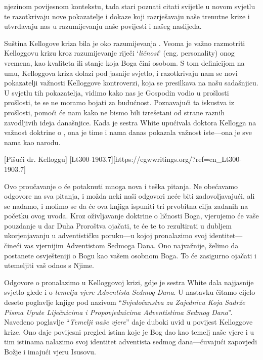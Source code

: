 njezinom povijesnom kontekstu, tada stari poznati citati svijetle u novom svjetlu te razotkrivaju nove pokazatelje i dokaze koji razrješavaju naše trenutne krize i utvrđavaju nas u razumijevanju naše povijesti i našeg naslijeđa.

Suština Kellogove kriza bila je oko razumijevanja . Veoma je važno razmotriti Kelloggovu krizu kroz razumijevanje riječi ‘\textit{ličnost}’ (eng. personality) onog vremena, kao kvaliteta ili stanje koja Boga čini osobom. S tom definicijom na umu, Kelloggova kriza dolazi pod jasnije svjetlo, i razotkrivaju nam se novi pokazatelji važnosti Kelloggove kontroverzi, koja se presilkava na našu sadašnjicu. U svjetlu tih pokazatelja, vidimo kako nas je Gospodin vodio u prošlosti prošlosti, te se ne moramo bojati za budućnost. Poznavajući ta iskustva iz prošlosti, pomoći će nam kako ne bismo bili izrešetani od strane raznih zavodljivih ideja današnjice. Kada je sestra White upućivala doktora Kellogga na važnost doktrine o , ona je time i nama danas pokazala važnost iste—ona je sve nama kao narodu.

[Pišući dr. Kelloggu] [Lt300-1903.7][https://egwwritings.org/?ref=en\_Lt300-1903.7]

Ovo proučavanje o  će potaknuti mnoga nova i teška pitanja. Ne obećavamo odgovore na sva pitanja, i možda neki naši odgovori neće biti zadovoljavajući, ali se nadamo, i molimo se da će ova knjiga ispuniti tri prvobitna cilja zadanih na početku ovog uvoda. Kroz oživljavanje doktrine o ličnosti Boga, vjerujemo će vaše pouzdanje u dar Duha Proroštva ojačati, te će te to rezultirati u dubljem ukorjenjavanju u adventističku poruku—u kojoj pronalazimo svoj identitet—čineći vas vjernijim Adventistom Sedmoga Dana. Ono najvažnije, želimo da postanete osvješteniji o Bogu kao vašem osobnom Boga. To će zasigurno ojačati i utemeljiti vaš odnos s Njime.

Odgovore o  pronalazimo u Kelloggovoj krizi, gdje je sestra White dala najjasnije svjetlo glede  i o \textit{temelju vjere Adventista Sedmog Dana}. U nastavku čitamo cijelo deseto poglavlje knjige pod nazivom “\textit{Svjedočanstva za Zajednicu Koja Sadrže Pisma Upute Liječnicima i Propovjednicima Adventistima Sedmog Dana}”. Navedeno poglavlje “\textit{Temelji naše vjere}” daje duboki uvid u povijest Kelloggove krize. Ono daje povijesni pregled istina koje je Bog dao kao temelj naše vjere i u tim istinama nalazimo svoj identitet adventista sedmog dana—čuvajući zapovjedi Božje i imajući vjeru Isusovu.

